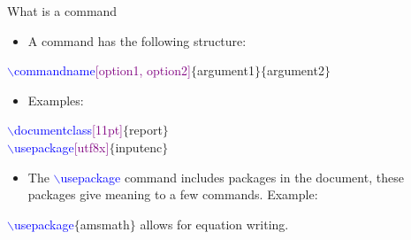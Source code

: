 \documentclass[usenames,dvipsnames,aspectratio=169]{beamer}
\newcommand{\aitem}{\item[$\cdot$]}
\begin{document}
%


\begin{frame}[t]{What is a command}
\begin{itemize}
\aitem A command has the following structure:
\end{itemize}
\textcolor{blue}{$\backslash$commandname}\textcolor{purple}{[option1, option2]}\textcolor{PineGreen}{$\{$argument1$\}\{$argument2$\}$}
\begin{itemize}
\aitem Examples:
\end{itemize}
\textcolor{blue}{$\backslash$documentclass}\textcolor{purple}{[11pt]}\textcolor{PineGreen}{$\{$report$\}$} \\
\textcolor{blue}{$\backslash$usepackage}\textcolor{purple}{[utf8x]}\textcolor{PineGreen}{$\{$inputenc$\}$}
\begin{itemize}
\aitem The \textcolor{blue}{$\backslash$usepackage} command includes packages in the document, these packages give meaning to a few commands. Example:
\end{itemize}
\textcolor{blue}{$\backslash$usepackage}\textcolor{PineGreen}{$\{$amsmath$\}$} allows for equation writing.
\end{frame}
\end{document}
